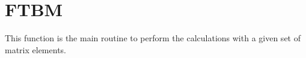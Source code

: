\section{FTBM}
\label{sect:ftbm}

\noindent This function is the main routine to perform the calculations with
a given set of matrix elements.\\
